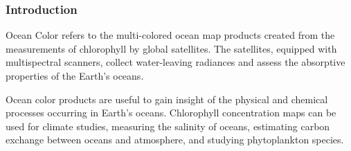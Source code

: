 \begin{frame}\frametitle{Introduction} 
Ocean Color refers to the multi-colored ocean map products created from the measurements of chlorophyll by global satellites. The satellites, equipped with multispectral scanners, collect water-leaving radiances and assess the absorptive properties of the Earth’s oceans.

Ocean color products are useful to gain insight of the physical and chemical processes occurring in Earth’s oceans. Chlorophyll concentration maps can be used for climate studies, measuring the salinity of oceans, estimating carbon exchange between oceans and atmosphere, and studying phytoplankton species.

\end{frame}
